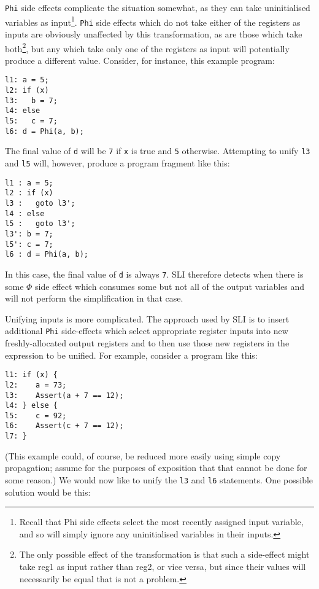 \verb|Phi| side effects complicate the situation somewhat, as they can
take uninitialised variables as input\footnote{Recall that Phi side
  effects select the most recently assigned input variable, and so
  will simply ignore any uninitialised variables in their inputs.}.
\verb|Phi| side effects which do not take either of the registers as
inputs are obviously unaffected by this transformation, as are those
which take both\footnote{The only possible effect of the
  transformation is that such a side-effect might take reg1 as input
  rather than reg2, or vice versa, but since their values will
  necessarily be equal that is not a problem.}, but any which take
only one of the registers as input will potentially produce a
different value.  Consider, for instance, this example program:

\begin{verbatim}
l1: a = 5;
l2: if (x)
l3:   b = 7;
l4: else
l5:   c = 7;
l6: d = Phi(a, b);
\end{verbatim}

The final value of \verb|d| will be \verb|7| if \verb|x| is true and
\verb|5| otherwise.  Attempting to unify \verb|l3| and \verb|l5| will,
however, produce a program fragment like this:

\begin{verbatim}
l1 : a = 5;
l2 : if (x)
l3 :   goto l3';
l4 : else
l5 :   goto l3';
l3': b = 7;
l5': c = 7;
l6 : d = Phi(a, b);
\end{verbatim}

In this case, the final value of \verb|d| is always \verb|7|.  SLI
therefore detects when there is some $\Phi$ side effect which consumes
some but not all of the output variables and will not perform the
simplification in that case.

Unifying inputs is more complicated.  The approach used by SLI is to
insert additional \verb|Phi| side-effects which select appropriate
register inputs into new freshly-allocated output registers and to
then use those new registers in the expression to be unified.  For
example, consider a program like this:

\begin{verbatim}
l1: if (x) {
l2:    a = 73;
l3:    Assert(a + 7 == 12);
l4: } else {
l5:    c = 92;
l6:    Assert(c + 7 == 12);
l7: }
\end{verbatim}

(This example could, of course, be reduced more easily using simple
copy propagation; assume for the purposes of exposition that that
cannot be done for some reason.)  We would now like to unify the
\verb|l3| and \verb|l6| statements.  One possible solution would be
this:

